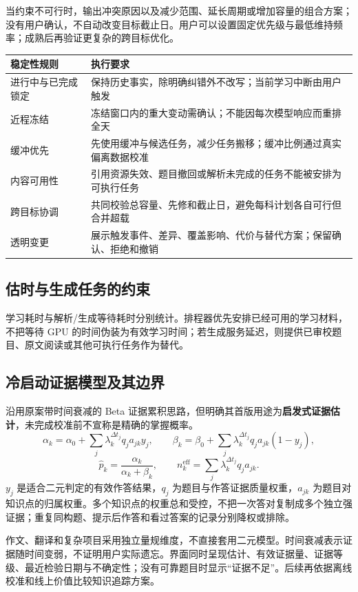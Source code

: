 \documentclass[UTF8,a4paper,11pt,fontset=none]{ctexart}
\newcommand{\cth}[1]{\textbf{\sffamily #1}}
\newcommand{\cont}[1]{\clearpage\noindent{\small\sffamily\color{Muted}#1}\par\vspace{3pt}}
\newenvironment{tbl}{\par\vspace{3pt}\small\noindent\ignorespaces}{\unskip\par\vspace{5pt}}
\begin{document}
当约束不可行时，输出冲突原因以及减少范围、延长周期或增加容量的组合方案；没有用户确认，不自动改变目标截止日。用户可以设置固定优先级与最低维持频率；成熟后再验证更复杂的跨目标优化。

\begin{tbl}
\begin{tabularx}{\linewidth}{@{}L{28mm}Y@{}}
\toprule
\cth{稳定性规则}&\cth{执行要求}\\\midrule
进行中与已完成锁定&保持历史事实，除明确纠错外不改写；当前学习中断由用户触发\\
近程冻结&冻结窗口内的重大变动需确认；不能因每次模型响应而重排全天\\
缓冲优先&先使用缓冲与候选任务，减少任务搬移；缓冲比例通过真实偏离数据校准\\
内容可用性&引用资源失效、题目撤回或解析未完成的任务不能被安排为可执行任务\\
跨目标协调&共同校验总容量、先修和截止日，避免每科计划各自可行但合并超载\\
透明变更&展示触发事件、差异、覆盖影响、代价与替代方案；保留确认、拒绝和撤销\\
\bottomrule
\end{tabularx}
\end{tbl}

\subsection{估时与生成任务的约束}
学习耗时与解析/生成等待耗时分别统计。排程器优先安排已经可用的学习材料，不把等待 GPU 的时间伪装为有效学习时间；若生成服务延迟，则提供已审校题目、原文阅读或其他可执行任务作为替代。

\cont{12 / 计划引擎与掌握证据（续）}
\subsection{冷启动证据模型及其边界}
沿用原案带时间衰减的 Beta 证据累积思路，但明确其首版用途为\textbf{启发式证据估计}，未完成校准前不宣称是精确的掌握概率。\cite{original}
\[
\alpha_k=\alpha_0+\sum_j\lambda_k^{\Delta t_j}q_j a_{jk}y_j,\qquad
\beta_k=\beta_0+\sum_j\lambda_k^{\Delta t_j}q_j a_{jk}(1-y_j),
\]
\[
\widehat p_k=\frac{\alpha_k}{\alpha_k+\beta_k},\qquad
n^{\mathrm{eff}}_k=\sum_j\lambda_k^{\Delta t_j}q_j a_{jk}.
\]
$y_j$ 是适合二元判定的有效作答结果，$q_j$ 为题目与作答证据质量权重，$a_{jk}$ 为题目对知识点的归属权重。多个知识点的权重总和受控，不把一次答对复制成多个独立强证据；重复同构题、提示后作答和看过答案的记录分别降权或排除。

作文、翻译和复杂项目采用独立量规维度，不直接套用二元模型。时间衰减表示证据随时间变弱，不证明用户实际遗忘。界面同时呈现估计、有效证据量、证据等级、最近检验日期与不确定性；没有可靠题目时显示“证据不足”。后续再依据离线校准和线上价值比较知识追踪方案。
\end{document}
